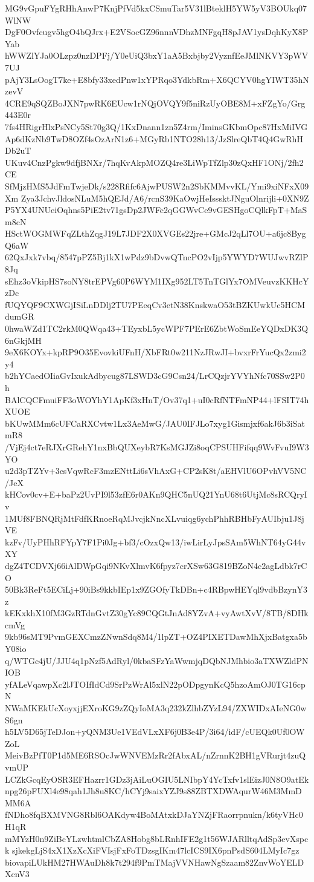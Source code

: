 MG9vGpuFYgRHhAnwP7KnjPfVd5kxCSmuTar5V31lBteklH5YW5yV3BOUkq07WlNW
DgF0Ovfcugv5hgO4bQJrx+E2VSocGZ96nnnVDhzMNFgqH8pJAV1ysDqhKyX8PYab
hWWZlYJa0OLzpz0nzDPFj/Y0eUiQ3bxY1aA5Bxbjby2VyznfEeJMlNKVY3pWV7UJ
pAjY3LsOogT7ke+E8bfy33xedPnw1xYPRqo3YdkbRm+X6QCYV0hgYIWT35hNzevV
4CRE9qSQZBoJXN7pwRK6EUcw1rNQjOVQY9f5niRzUyOBE8M+xFZgYo/Grg443E0r
7fs4HRigrHlxPsNCy5St70g3Q/1KxDnann1zn5Z4rm/IminsGKbmOpc87HxMiIVG
Ap6dKzNb9TwD8OZf4sOzArN1z6+MGyRb1NTO28h13/JzSlreQbT4Q4GwRhHDb2uT
UKuv4CnzPgkw9dfjBNXr/7hqKvAkpMOZQ4re3LiWpTfZlp30zQxHF1ONj/2fh2CE
SfMjzHMS5JdFmTwjeDk/s228Rfifc6AjwPUSW2n2SbKMMvvKL/Ymi9xiNFxX09Xm
Zya3JchvJldosNLuM5hQEJd/A6/rcnS39KaOwjHeIsssktJNguOlnrijli+0XN9Z
P5YX4UNUeiOqhns5PiE2tv71gsDp2JWFc2qGGWvCe9vGESHgoCQlkFpT+MaSm8cN
HSctWOGMWFqZLthZqgJ19L7JDF2X0XVGEs22jre+GMcJ2qLl7OU+a6jc8BygQ6aW
62QxJxk7vbq/8547pPZ5Bj1kX1wPdz9bDvwQTncPO2vIjp5YWYD7WUJwvRZlP8Jq
sEhz3oVkipHS7soNY8trEPVg60P6WYM1IXg952LT5TnTGlYx7OMVeuvzKKHcYzDc
fUQYQF9CXWGjISiLnDDlj2TU7PEeqCv3etN38KnskwaO53tBZKUwkUc5HCMdumGR
0hwaWZd1TC2rkM0QWqa43+TEyxbL5ycWPF7PErE6ZbtWoSmEeYQDxDK3Q6nGkjMH
9eX6KOYx+kpRP9O35EvovkiUFnH/XbFRt0w211NzJRwJI+bvxrFrYucQx2zmi2y4
b2hYCaedOIiaGvIxukAdbycug87LSWD3cG9Csn24/LrCQzjrYVYhNfc70SSw2P0h
BAlCQCFmuiFF3oWOYhY1ApKf3xHnT/Ov37q1+uI0cRfNTFmNP44+lFSIT74hXUOE
bKUwMMm6cUFCaRXCvtw1Lx3AeMwG/JAU0IFJLo7xyg1Gismjxf6akJ6b3iSatmR8
/VjEj4ct7eRJXrGRehY1nxBbQUXeybR7KsMGJZi8oqCPSUHFifqq9WvFvuI9W3YO
u2d3pTZYv+3csVqwRcF3mzENttLi6sVhAxG+CP2sK8t/aEHVlU6OPvhVV5NC/JeX
kHCov0cv+E+baPz2UvPI9l53zfE6r0AKn9QHC5nUQ21YnU68t6UtjMc8sRCQryIv
1MUf8FBNQRjMtFdfKRnoeRqMJvcjkNncXLvuiqg6ychPhhRBHbFyAUIbju1J8jVE
kzFv/UyPHhRFYpY7F1Pi0Jg+bf3/cOzxQw13/iwLirLyJpsSAm5WhNT64yG44vXY
dgZ4TCDVXj66iAlDWpGqi9NKvXlmvK6fpyz7crXSw63G819BZoN4c2agLdbk7rCO
50Bk3ReFt5ECiLj+90iBs9kkbIEp1x9ZGOfyTkDBn+c4RBpwHEYql9vdbBzynY3z
kEKxkhX10fM3GzRTdnGvtZ30gYc89CQGtJnAd8YZvA+vyAwtXvV/8TB/8DHkcmVg
9kb96sMT9PvmGEXCmzZNwnSdq8M4/1lpZT+OZ4PIXETDawMhXjxBatgxa5bY08io
q/WTGc4jU/JJU4q1pNzf5AdRyl/0kbaSFzYaWwmjqDQbNJMhbio3aTXWZldPNIOB
yfALeVqawpXc2lJTOIfIdCd9SrPzWrAl5xlN22pODpgynKcQ5hzoAmOJ0TG16cpN
NWaMKEkUcXoyxjjEXroKG9zZQyIoMA3q232kZlhbZYzL94/ZXWIDxAIeNG0wS6gn
h5LV5D65jTeDJon+yQNM3Ue1VEdVLxXF6j0B3e4P/3i64/idF/cUEQk0Uf0OWZoL
MeivBzPfT0P1d5ME6RSOcJwWNVEMzRr2fAbxAL/nZrnnK2BH1gVRurjt4zuQvmUP
LCZkGcqEyOSR3EFHazrr1GDz3jAiLuOGIU5LNIbpY4YcTxfv1slEizJ0N8O9atEk
npg26pFUXl4e98qah1Jh8u8KC/hCYj9saixYZJ9s88ZBTXDWAqurW46M3MmDMM6A
fNDho8fqBXMVNG8Rbl6OAKdyw4BoMAtxkDJaYNZjFRaorrpnukn/k6tyVHc0H1qR
mMYzH0n9ZiBcYLzwhtmlCbZA8Hobg8bLRnhIFE2g1t56WJARlltqAdSp3evXspck
sjkekgLjS4xX1XzXcXiFVIsjFxFoTDzsgIKm47lcICS9IX6pnPsdS604LMyIc7gz
biovapiLUkHM27HWAuDh8k7t294f9PmTMajVVNHawNgSzaam82ZnvWoYELDXcnV3
